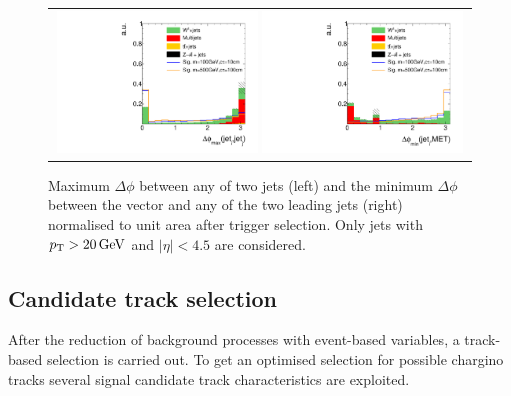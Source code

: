 \begin{figure}[!b]
  \centering 
  \begin{tabular}{c}
    \includegraphics[width=0.49\textwidth]{figures/analysis_2/AnalysisSelection/chiTrackstriggerRequirementsTrigger_2Signals_FullBkg/hDeltaPhiMaxbeforeCut_lin.pdf}
    \includegraphics[width=0.49\textwidth]{figures/analysis_2/AnalysisSelection/chiTrackstriggerRequirementsTrigger_2Signals_FullBkg/hDeltaPhiJetMetMinbeforeCut_lin.pdf}
  \end{tabular}
  \caption{Maximum $\Delta \phi$ between any of two jets (left) and the minimum $\Delta \phi$  between the \met vector and any of the two leading jets (right) normalised to unit area after trigger selection.
           Only jets with $p_{\text{T}}>20\,\text{Ge}\kern-0.06667em\text{V}$ and $|\eta|<4.5$ are considered.}
  \label{fig:QCDcuts}
\end{figure}


\subsection{Candidate track selection}
\label{sec:CandidateTrackSelection}
After the reduction of background processes with event-based variables, a track-based selection is carried out.
To get an optimised selection for possible chargino tracks several signal candidate track characteristics are exploited.\\

